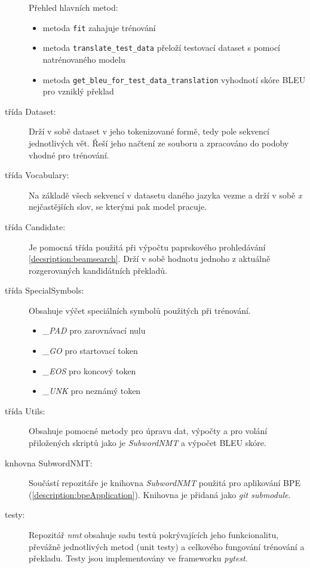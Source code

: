 \begin{description}
      Přehled hlavních metod:
      \begin{itemize}
                  \item metoda \texttt{fit} zahajuje trénování
                  \item metoda \texttt{translate\_test\_data} přeloží testovací dataset s pomocí natrénovaného modelu
                  \item metoda \texttt{get\_bleu\_for\_test\_data\_translation} vyhodnotí skóre BLEU pro vzniklý překlad
      \end{itemize}
  \item[třída Dataset:] Drží v sobě dataset v jeho tokenizované formě, tedy pole sekvencí jednotlivých vět. Řeší jeho načtení ze souboru a zpracováno do podoby vhodné pro trénování.
  \item[třída Vocabulary:] Na základě všech sekvencí v datasetu daného jazyka vezme a drží v sobě \emph{x} nejčastějších slov, se kterými pak model pracuje.
  \item[třída Candidate:] Je pomocná třída použitá při výpočtu paprskového prohledávání \ref{decsription:beamsearch}. Drží v sobě hodnotu jednoho z aktuálně rozgerovaných kandidátních překladů.
  \item[třída SpecialSymbols:] Obsahuje výčet speciálních symbolů použitých při trénování. \begin{itemize}
                  \item \emph{\_PAD} pro zarovnávací nulu
                  \item \emph{\_GO} pro startovací token
                  \item \emph{\_EOS} pro koncový token
                  \item \emph{\_UNK} pro neznámý token
                \end{itemize}
  \item[třída Utils:] Obsahuje pomocné metody pro úpravu dat, výpočty a pro volání přiložených skriptů jako je \emph{SubwordNMT} a výpočet BLEU skóre.
  \item[knhovna SubwordNMT:] Součástí repozitáře je knihovna \emph{SubwordNMT} použitá pro aplikování BPE (\ref{description:bpeApplication}). Knihovna je přidaná jako \emph{git submodule}.
  \item[testy:] Repozitář \emph{nmt} obsahuje sadu testů pokrývajících jeho funkcionalitu, převážně jednotlivých metod (unit testy) a celkového fungování trénování a překladu. Testy jsou implementovány ve frameworku \emph{pytest}.
\end{description}

